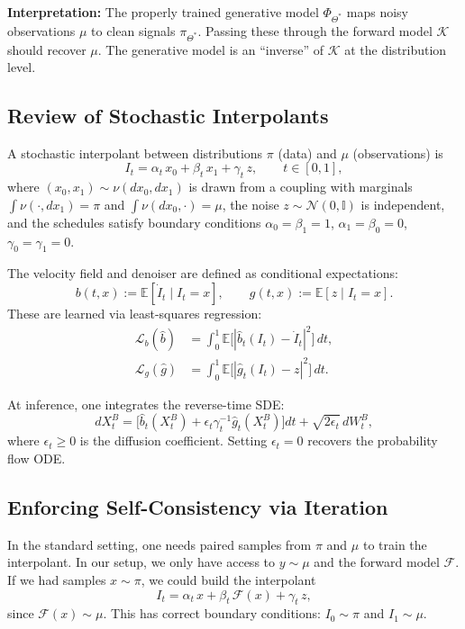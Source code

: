 \documentclass[12pt,fleqn]{article}
\numberwithin{equation}{section}
\newcommand{\N}{\mathcal{N}}
\newcommand{\I}{\mathbb{I}}
\begin{document}
\noindent\textbf{Interpretation:} The properly trained generative model $\Phi_{\Theta^*}$ maps noisy observations $\mu$ to clean signals $\pi_{\Theta^*}$. Passing these through the forward model $\mathcal K$ should recover $\mu$. The generative model is an ``inverse'' of $\mathcal K$ at the distribution level.

\subsection{Review of Stochastic Interpolants}

A stochastic interpolant between distributions $\pi$ (data) and $\mu$ (observations) is
\begin{equation}
	I_t = \alpha_t \, x_0 + \beta_t \, x_1 + \gamma_t \, z, \qquad t \in [0,1], \label{eq:SI}
\end{equation}
where $(x_0, x_1) \sim \nu(dx_0, dx_1)$ is drawn from a coupling with marginals $\int \nu(\cdot, dx_1) = \pi$ and $\int \nu(dx_0, \cdot) = \mu$, the noise $z \sim \N(0, \I)$ is independent, and the schedules satisfy boundary conditions $\alpha_0 = \beta_1 = 1$, $\alpha_1 = \beta_0 = 0$, $\gamma_0 = \gamma_1 = 0$.

The velocity field and denoiser are defined as conditional expectations:
\[
	b(t,x) := \mathbb E[\dot I_t \mid I_t = x], \qquad g(t,x) := \mathbb E[z \mid I_t = x].
\]
These are learned via least-squares regression:
\begin{align}
	\mathcal L_b(\hat b) &= \int_0^1 \mathbb E\bigl[|\hat b_t(I_t) - \dot I_t|^2\bigr]\, dt, \label{eq:driftloss} \\
	\mathcal L_g(\hat g) &= \int_0^1 \mathbb E\bigl[|\hat g_t(I_t) - z|^2\bigr] \, dt. \label{eq:denoiserloss}
\end{align}

At inference, one integrates the reverse-time SDE:
\begin{equation}
	dX_t^B = \bigl[\hat b_t(X_t^B) + \epsilon_t \gamma_t^{-1} \hat g_t(X_t^B)\bigr] dt + \sqrt{2\epsilon_t}\, dW_t^B, \label{eq:reverseSDE}
\end{equation}
where $\epsilon_t \geq 0$ is the diffusion coefficient. Setting $\epsilon_t = 0$ recovers the probability flow ODE.

\subsection{Enforcing Self-Consistency via Iteration}

In the standard setting, one needs paired samples from $\pi$ and $\mu$ to train the interpolant. In our setup, we only have access to $y \sim \mu$ and the forward model $\mathcal F$. If we had samples $x \sim \pi$, we could build the interpolant
\begin{equation}
	I_t = \alpha_t \, x + \beta_t \, \mathcal F(x) + \gamma_t \, z, \label{eq:oracle_interp}
\end{equation}
since $\mathcal F(x) \sim \mu$. This has correct boundary conditions: $I_0 \sim \pi$ and $I_1 \sim \mu$.
\end{document}
